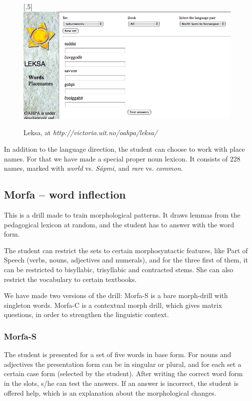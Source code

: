 \documentclass[a4paper,12pt]{article}
\begin{document}
\begin{figure}[htbp]
\begin{center}
\scalebox{.5}[.5]{\includegraphics{img/leksa.png}}\\
\caption{Leksa, at \textit{http://victorio.uit.no/oahpa/leksa/}}
\label{leksa}
\end{center}
\end{figure}

\vspace{0.5cm}
In addition to the language direction, the student can choose to work with place names. For that we have made a special proper noun lexicon. It consists of 228 names, marked with \textit{world} vs. \textit{Sápmi}, and \textit{rare} vs. \textit{common}. 


\subsection{Morfa -- word inflection}
This is a drill made to train morphological patterns. It draws lemmas from the pedagogical lexicon at random, and the student has to answer with the word form. 

The student can restrict the sets to certain morphosyntactic features, like Part of Speech (verbs, nouns, adjectives and numerals), and for the three first of them, it can be restricted to bisyllabic, trisyllabic and contracted stems. She can also restrict the vocabulary to certain textbooks.

We have made two versions of the drill: Morfa-S is a bare morph-drill with singleton words. Morfa-C is a contextual morph drill, which gives matrix questions, in order to strengthen the linguistic context.

\subsubsection{Morfa-S}
The student is presented for a set of five words in base form. For nouns and adjectives the presentation form can be in singular or plural, and for each set a certain case form (selected by the student). After writing the correct word form in the slots, s/he can test the answers. If an answer is incorrect, the student is offered help, which is an explanation about the morphological changes.
\end{document}
